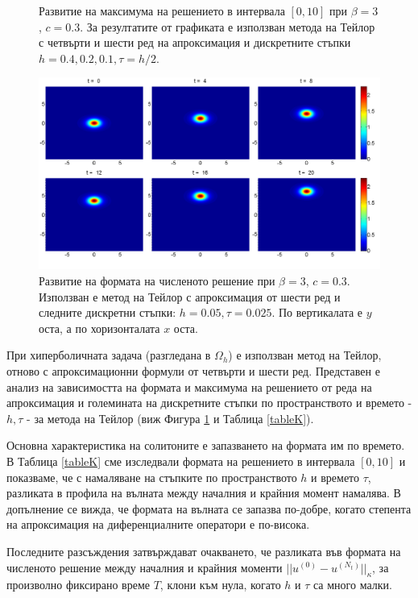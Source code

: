 \documentclass[a5paper]{article}
\theoremstyle{remark}
\begin{document}
\begin{large}
\begin{figure}
\caption{Развитие на максимума на решението в интервала $[0, 10]$ при $\beta = 3$, $c=0.3$. За резултатите от графиката е използван метода на Тейлор с четвърти и шести ред на апроксимация и дискретните стъпки $h=0.4, 0.2, 0.1, \tau = h/2$.}
\label{MultiMaximum}
\end{figure}
\begin{figure}
	\centering
	\includegraphics[width=\linewidth]{SolutionView/TaylorZeroBnd_50_ZB2_bt3_c030_h005_TAll_O(h^6).png}
\caption{Развитие на формата на численото решение при $\beta = 3$, $c=0.3$. Използван е метод на Тейлор с апроксимация от шести ред и следните дискретни стъпки: $h=0.05, \tau = 0.025$. По вертикалата е $y$ оста, а по хоризонталата $x$ оста.}
\label{solShape3}
\end{figure}
При хиперболичната задача (разгледана в $\Omega_h$) е използван метод на Тейлор, отново с апроксимационни формули от четвърти и шести ред. Представен е анализ на зависимостта на формата и максимума на решението от реда на апроксимация и големината на дискретните стъпки по пространството и времето - $h, \tau$ - за метода на Тейлор (виж Фигура \ref{MultiMaximum} и Таблица \ref{tableK}). 

Основна характеристика на солитоните е запазването на формата им по времето. В Таблица \ref{tableK} сме изследвали формата на решението в интервала $[0, 10]$ и показваме, че с намаляване на стъпките по пространството $h$ и времето $\tau$, разликата в профила на вълната между началния и крайния момент намалява. 
В допълнение се вижда, че формата на вълната се запазва по-добре, когато степента на апроксимация на диференциалните оператори е по-висока. 

Последните разсъждения затвърждават очакването, че разликата във формата на численото решение между началния и крайния моменти $||u^{(0)} - u^{(N_t)}||_\kappa$, за произволно фиксирано време $T$, клони към нула, когато $h$ и $\tau$ са много малки.


\end{large}
\end{document}
